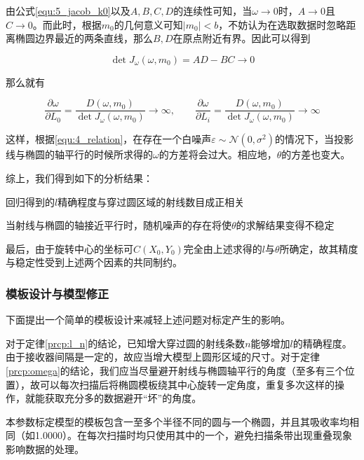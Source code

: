 由公式\ref{equ:5_jacob_k0}以及$A, B, C, D$的连续性可知，当$\omega \to 0$时，$A \to 0$且$C \to 0$。而此时，根据$m_0$的几何意义可知$|m_0| < b$，不妨认为在选取数据时忽略距离椭圆边界最近的两条直线，那么$B, D$在原点附近有界。因此可以得到

\begin{equation}
	\det J_\omega(\omega, m_0) = AD - BC \to 0
	\label{equ:5_det_to_0}
\end{equation}

那么就有

\begin{equation}
	\frac{\partial \omega}{\partial L_0} = \frac{D(\omega, m_0)}{\det J_\omega(\omega, m_0)}  \to \infty,\quad\quad
	\frac{\partial \omega}{\partial L_i} = \frac{D(\omega, m_0)}{\det J_\omega(\omega, m_0)}  \to \infty
	\label{equ:5_partial_to_inf}
\end{equation}

这样，根据\ref{equ:4_relation}，在存在一个白噪声$\varepsilon\sim\mathcal N(0, \sigma^2)$的情况下，当投影线与椭圆的轴平行的时候所求得的$\omega$的方差将会过大。相应地，$\theta$的方差也变大。

综上，我们得到如下的分析结果：
\begin{principle}
\label{prcp:l_n}
回归得到的$l$精确程度与穿过圆区域的射线数目成正相关
\end{principle}

\begin{principle}
\label{prcp:omega}
当射线与椭圆的轴接近平行时，随机噪声的存在将使$\theta$的求解结果变得不稳定
\end{principle}

最后，由于旋转中心的坐标可$C(X_0,Y_0)$完全由上述求得的$l$与$\theta$所确定，故其精度与稳定性受到上述两个因素的共同制约。


\subsubsection{模板设计与模型修正}

下面提出一个简单的模板设计来减轻上述问题对标定产生的影响。

对于定律\ref{prcp:l_n}的结论，已知增大穿过圆的射线条数$n$能够增加$l$的精确程度。由于接收器间隔是一定的，故应当增大模型上圆形区域的尺寸。对于定律\ref{prcp:omega}的结论，我们应当尽量避开射线与椭圆轴平行的角度（至多有三个位置），故可以每次扫描后将椭圆模板绕其中心旋转一定角度，重复多次这样的操作，就能获取充分多的数据避开“坏”的角度。

本参数标定模型的模板包含一至多个半径不同的圆与一个椭圆，并且其吸收率均相同（如1.0000）。在每次扫描时均只使用其中的一个，避免扫描条带出现重叠现象影响数据的处理。

